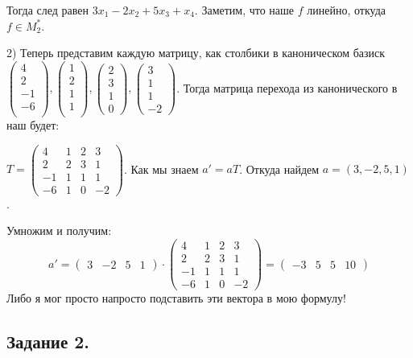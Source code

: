 \documentclass{article}
\begin{document}
Тогда след равен $3x_1-2x_2 +5x_3 + x_4$. Заметим, что наше $f$ линейно, откуда $f \in M_2^*$. 

2) Теперь представим каждую матрицу, как столбики в каноническом базиск $\begin{pmatrix}
    4 \\
    2 \\
    -1\\
    -6\\
\end{pmatrix}, \begin{pmatrix}
    1 \\
    2\\
    1\\
    1\\
\end{pmatrix},\begin{pmatrix}
    2\\
    3\\
    1\\
    0
\end{pmatrix}, \begin{pmatrix}
    3 \\
    1\\
    1\\
    -2
\end{pmatrix}$. Тогда матрица перехода из канонического в наш будет:

$T = \begin{pmatrix}
    4 & 1 & 2 &3 \\
    2 & 2 &3 & 1\\
    -1 &1 & 1 &1\\
    -6 & 1 & 0 &-2
\end{pmatrix}$.  Как мы знаем $a'=aT$. Откуда найдем $a = (3,-2,5,1)$. 

Умножим и получим: $$a' = \begin{pmatrix}
    3 & -2 & 5 & 1
\end{pmatrix} \cdot \begin{pmatrix}
    4 & 1 & 2 &3 \\
    2 & 2 &3 & 1\\
    -1 &1 & 1 &1\\
    -6 & 1 & 0 &-2
\end{pmatrix} = \begin{pmatrix}
    -3 & 5 &5& 10
\end{pmatrix} $$
Либо я мог просто напросто подставить эти вектора в мою формулу!
\newpage
\subsection{Задание 2.}
\end{document}
